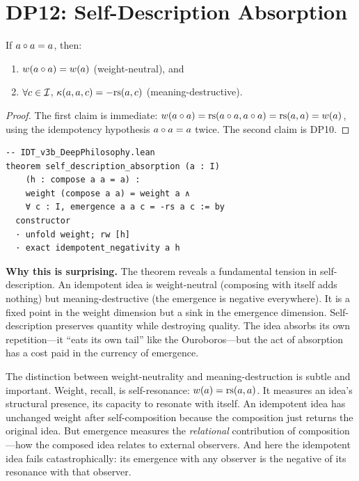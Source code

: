 \section{DP12: Self-Description Absorption}

\begin{theorem}
\label{thm:self-description-absorption}
If $a \circ a = a$, then:
\begin{enumerate}
\item $w(a \circ a) = w(a)$ \hfill (weight-neutral), and
\item $\forall c \in \mathcal{I}$, $\kappa(a, a, c) = -\mathrm{rs}(a, c)$
\hfill (meaning-destructive).
\end{enumerate}
\end{theorem}

\begin{proof}
The first claim is immediate: $w(a \circ a) = \mathrm{rs}(a \circ a,
a \circ a) = \mathrm{rs}(a, a) = w(a)$, using the idempotency hypothesis
$a \circ a = a$ twice. The second claim is DP10.
\end{proof}

\begin{lstlisting}
-- IDT_v3b_DeepPhilosophy.lean
theorem self_description_absorption (a : I)
    (h : compose a a = a) :
    weight (compose a a) = weight a ∧
    ∀ c : I, emergence a a c = -rs a c := by
  constructor
  · unfold weight; rw [h]
  · exact idempotent_negativity a h
\end{lstlisting}

\begin{surprisebox}
\textbf{Why this is surprising.} The theorem reveals a fundamental
tension in self-description. An idempotent idea is weight-neutral
(composing with itself adds nothing) but meaning-destructive (the
emergence is negative everywhere). It is a fixed point in the weight
dimension but a sink in the emergence dimension. Self-description
preserves quantity while destroying quality. The idea absorbs its own
repetition---it ``eats its own tail'' like the Ouroboros---but the act
of absorption has a cost paid in the currency of emergence.
\end{surprisebox}

The distinction between weight-neutrality and meaning-destruction is
subtle and important. Weight, recall, is self-resonance: $w(a) =
\mathrm{rs}(a, a)$. It measures an idea's structural presence, its capacity to
resonate with itself. An idempotent idea has unchanged weight after
self-composition because the composition just returns the original idea.
But emergence measures the \emph{relational} contribution of
composition---how the composed idea relates to external observers. And
here the idempotent idea fails catastrophically: its emergence with any
observer is the negative of its resonance with that observer.

